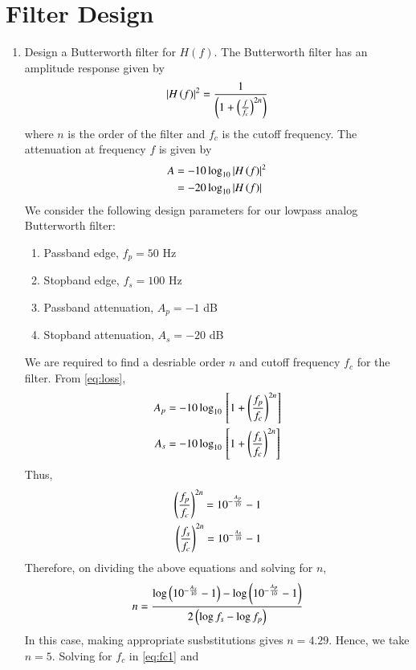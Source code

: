 \documentclass[journal,12pt,twocolumn]{IEEEtran}
\renewcommand\thesection{\arabic{section}}
\begin{document}
\section{Filter Design}
\begin{enumerate}[label=\thesection.\arabic*
,ref=\thesection.\theenumi]
\item Design a Butterworth filter for $H(f)$.
\solution The Butterworth filter has an amplitude response
given by
\begin{align}
    \left\vert H\left(f\right)\right\vert^2 = \frac{1}{\left(1 + \left(\frac{f}{f_c}\right)^{2n}\right)}
\end{align}
where $n$ is the order of the filter and $f_c$ is the cutoff
frequency. The attenuation at frequency $f$ is given by 
\begin{align}
    A &= -10\log_{10}\left\vert H\left(f\right)\right\vert^2 \\
      &= -20\log_{10}\left\vert H\left(f\right)\right\vert
    \label{eq:loss}
\end{align}
We consider the following design parameters for our
lowpass analog Butterworth filter:
\begin{enumerate}
    \item Passband edge, $f_p = 50$ Hz
    \item Stopband edge, $f_s = 100$ Hz
    \item Passband attenuation, $A_p = -1$ dB
    \item Stopband attenuation, $A_s = -20$ dB
\end{enumerate}
We are required to find a desriable order $n$ and cutoff
frequency $f_c$ for the filter. From \eqref{eq:loss},
\begin{align}
    A_p &= -10\log_{10}{}\left[1 + \left(\frac{f_p}{f_c}\right)^{2n}\right] \\
    A_s &= -10\log_{10}{}\left[1 + \left(\frac{f_s}{f_c}\right)^{2n}\right]
\end{align}
Thus,
\begin{align}
    \left(\frac{f_p}{f_c}\right)^{2n} = 10^{-\frac{A_p}{10}} - 1 \label{eq:fc1} \\
    \left(\frac{f_s}{f_c}\right)^{2n} = 10^{-\frac{A_s}{10}} - 1 \label{eq:fc2}
\end{align}
Therefore, on dividing the above equations and solving for $n$,
\begin{align}
    n = \frac{\log\left(10^{-\frac{A_s}{10}} - 1\right) - 
    \log\left(10^{-\frac{A_p}{10}} - 1\right)}{2\left(\log{f_s} - \log{f_p}\right)}
\end{align}
In this case, making appropriate susbstitutions gives $n = 4.29$.
Hence, we take $n = 5$. Solving for $f_c$ in \eqref{eq:fc1} and

\end{enumerate}
\end{document}
